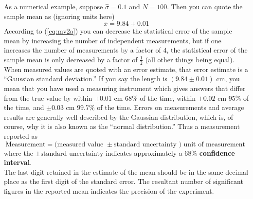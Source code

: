 \documentclass[12pt]{article}
\begin{document}
As a numerical example, suppose $\hat{\sigma} = 0.1$ and $N = 100$.
Then you can quote the sample mean as (ignoring units here)
\begin{equation}
  \bar{x} = 9.84 \pm 0.01
\end{equation}
According to (\ref{eq:mv2a}) you can decrease the statistical error of the sample mean
  by increasing the number of independent measurements, but if one increases
  the number of measurements by a factor of $4$, the statistical error of the
   sample mean is only decreased by a factor of $\frac{1}{2}$ (all other things being equal).\\
   
\noindent When measured values are quoted with an error estimate, that error estimate
  is a ``Gaussian standard deviation.''
If you say the length is $(9.84 \pm 0.01)$ cm, you mean that you have used
  a measuring instrument which gives answers that differ from the true value by
   within $\pm 0.01$ cm  $68\%$ of the time,  within $\pm 0.02$ cm  $95\%$ of the time,
   and $\pm 0.03$ cm $99.7\%$ of the time.
Errors on measurements and average results are generally well described by the Gaussian
   distribution, which is, of course, why it is also known as the ``normal distribution.''
Thus a measurement reported as
\begin{equation}
 \text{Measurement} = \text{(measured value } \pm \text{standard uncertainty ) unit of measurement } 
\end{equation}
  where the $\pm \text{standard uncertainty}$ indicates approximately a $68\%$ \textbf{confidence interval}.\\
  
\noindent The last digit retained in the estimate of the mean should be in the same decimal place as the first digit of the standard error.
The resultant number of significant figures in the reported mean indicates the precision of the experiment.  
\end{document}
